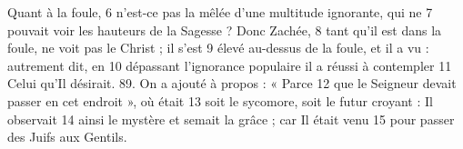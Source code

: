 Quant à la foule,	 
6	 	n'est-ce pas la mêlée d'une multitude ignorante, qui ne	 
7	 	pouvait voir les hauteurs de la Sagesse ? Donc Zachée,	 
8	 	tant qu'il est dans la foule, ne voit pas le Christ ; il s'est	 
9	 	élevé au-dessus de la foule, et il a vu : autrement dit, en	 
10	 	dépassant l'ignorance populaire il a réussi à contempler	 
11	 	Celui qu'Il désirait. 89. On a ajouté à propos : « Parce	 
12	 	que le Seigneur devait passer en cet endroit », où était	 
13	 	soit le sycomore, soit le futur croyant : Il observait	 
14	 	ainsi le mystère et semait la grâce ; car Il était venu	 
15	 	pour passer des Juifs aux Gentils.